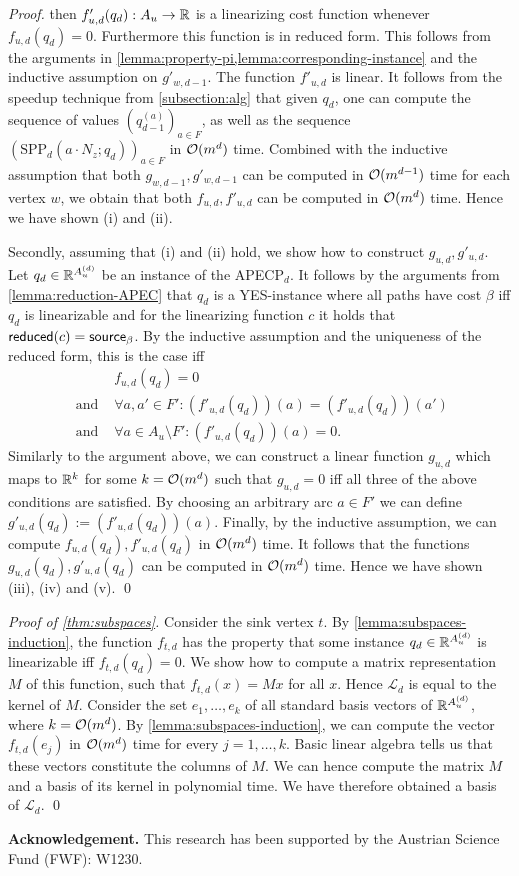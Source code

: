 \begin{proof}
    then $f'_{u,d}(q_d) : A_u \rightarrow \mathbb{R}$ is a linearizing cost function whenever $f_{u,d}(q_d) = 0$. Furthermore this function is in reduced form. This follows from the arguments in \cref{lemma:property-pi,lemma:corresponding-instance} and the inductive assumption on $g'_{w,d-1}$. 
    The function $f'_{u,d}$ is linear. 
    It follows from the speedup technique from \cref{subsection:alg} that given $q_d$, one can compute the sequence of values $(q^{(a)}_{d-1})_{a \in F}$, as well as the sequence $(\text{SPP}_d(a \cdot N_z; q_d))_{a\in F}$ in $\mathcal{O}(m^d)$ time. 
    Combined with the inductive assumption that both $g_{w,d-1}, g'_{w,d-1}$ can be computed in $\mathcal{O}(m^{d-1})$ time for each vertex $w$, we obtain that both $f_{u,d}, f'_{u,d}$ can be computed in $\mathcal{O}(m^d)$ time. Hence we have shown (i) and (ii).

    Secondly, assuming that (i) and (ii) hold, we show how to construct $g_{u,d}, g'_{u,d}$. Let $q_d \in \mathbb{R}^{A_u^{(d)}}$ be an instance of the APECP$_d$. It follows by the arguments from \cref{lemma:reduction-APEC} that $q_d$ is a YES-instance where all paths have cost $\beta$ iff $q_d$ is linearizable and for the linearizing function $c$ it holds that $\operatorname{\textsf{reduced}}(c) = \textsf{source}_\beta$. By the inductive assumption and the uniqueness of the reduced form, this is the case iff 
    \begin{align*}
        &f_{u,d}(q_d) = 0 \\
        \text{ and } &\forall a,a' \in F':  (f'_{u,d}(q_d))(a) = (f'_{u,d}(q_d))(a') \\
        \text{ and } &\forall a \in A_u \setminus F': (f'_{u,d}(q_d))(a) = 0. 
    \end{align*}
    Similarly to the argument above, we can construct a linear function $g_{u,d}$ which maps to $\mathbb{R}^k$ for some $k = \mathcal{O}(m^d)$ such that $g_{u,d} = 0$ iff all three of the above conditions are satisfied. By choosing an arbitrary arc $a \in F'$ we can define $g'_{u,d}(q_d) := (f'_{u,d}(q_d))(a)$. Finally, by the inductive assumption, we can compute $f_{u,d}(q_d), f'_{u,d}(q_d)$ in $\mathcal{O}(m^d)$ time. It follows that the functions $g_{u,d}(q_d), g'_{u,d}(q_d)$ can be computed in $\mathcal{O}(m^d)$ time. Hence we have shown (iii), (iv) and (v). \qed
\end{proof}

\begin{proof}[Proof of \cref{thm:subspaces}]
    Consider the sink vertex $t$. By \cref{lemma:subspaces-induction}, the function $f_{t,d}$ has the property that some instance $q_d \in \mathbb{R}^{A_u^{(d)}}$ is linearizable iff $f_{t,d}(q_d) = 0$. 
    We show how to compute a matrix representation $M$ of this function, such that $f_{t,d}(x) = Mx$ for all $x$. Hence $\mathcal{L}_d$ is equal to the kernel of $M$.
    Consider the set $e_1,\dots, e_k$ of all standard basis vectors of $\mathbb{R}^{A_u^{(d)}}$, where $k = \mathcal{O}(m^d)$. By \cref{lemma:subspaces-induction}, we can compute the vector $f_{t,d}(e_j)$ in $\mathcal{O}(m^d)$ time for every $j=1,\dots,k$. Basic linear algebra tells us that these vectors constitute the columns of $M$. We can hence compute the matrix $M$ and a basis of its kernel in polynomial time. We have therefore obtained a basis of $\mathcal{L}_d$. \qed
\end{proof}

\noindent \textbf{ Acknowledgement.} This research has been supported by the Austrian Science Fund (FWF): W1230.
